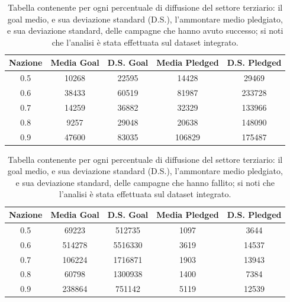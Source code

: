 \begin{table}
	\caption{Tabella contenente per ogni percentuale di diffusione del settore terziario: il goal medio, e sua deviazione standard (D.S.), l'ammontare medio pledgiato, e sua deviazione standard, delle campagne che hanno avuto successo; si noti che l'analisi è stata effettuata sul dataset integrato.}
	
	\label{tab:succ_mean_sd}
	
	\centering
	\begin{tabular}{|c|c|c|c|c|}
		\hline
		\textbf{Nazione} & \textbf{Media Goal} & \textbf{D.S. Goal} & \textbf{Media Pledged} & \textbf{D.S. Pledged} \\ \hline
		0.5&10268&22595&14428&29469 \\ \hline
		0.6&38433&60519&81987&233728
\\ \hline
		0.7&14259&36882&32329&133966
\\ \hline
		0.8&9257&29048&20638&148090
\\ \hline
		0.9&47600&83035&106829&175487 \\ \hline
	\end{tabular}
\end{table}

\begin{table}
	\caption{Tabella contenente per ogni percentuale di diffusione del settore terziario: il goal medio, e sua deviazione standard (D.S.), l'ammontare medio pledgiato, e sua deviazione standard, delle campagne che hanno fallito; si noti che l'analisi è stata effettuata sul dataset integrato.}
	
	\label{tab:fail_mean_sd}
	
	\centering
	\begin{tabular}{|c|c|c|c|c|}
		\hline
		\textbf{Nazione} & \textbf{Media Goal} & \textbf{D.S. Goal} & \textbf{Media Pledged} & \textbf{D.S. Pledged} \\ \hline
		0.5&69223&512735&1097&3644 \\ \hline
		0.6&514278&5516330&3619&14537 \\ \hline
		0.7&106224&1716871&1903&13943
\\ \hline
		0.8&60798&1300938&1400&7384
\\ \hline
		0.9&238864&751142&5119&12539 \\ \hline
	\end{tabular}
\end{table}